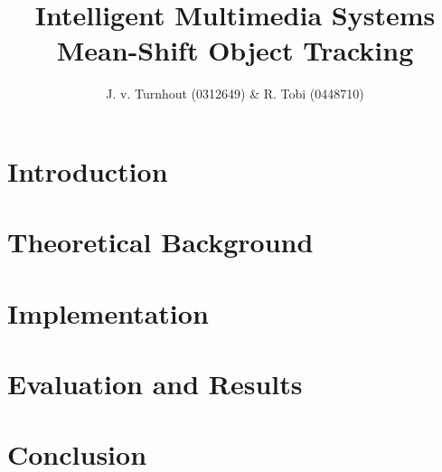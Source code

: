 \documentclass[a4paper,11pt]{article}
\title{Intelligent Multimedia Systems\\Mean-Shift Object Tracking}
\author{J. v. Turnhout (0312649) \& R. Tobi (0448710)}
\begin{document}
	\maketitle

	\section*{Introduction}

	\section*{Theoretical Background}

	\section*{Implementation}

	\section*{Evaluation and Results}

	\section*{Conclusion}
\end{document}
